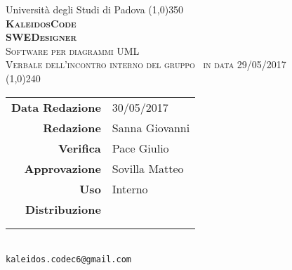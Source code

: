 \documentclass[a4paper,12pt]{article}
\author{KaleidosCode}
\date{29/05/2017}
\begin{document}
	\begin{titlepage}
		\centering Università degli Studi di Padova
		\line(1,0){350}\\
		\vspace{0.4cm}
		{\bfseries\scshape\LARGE KaleidosCode\\}
		\vspace{0.4cm}
		{\bfseries\scshape\LARGE SWEDesigner\\}
		{\scshape\Large Software per diagrammi UML\\}
		\vspace{1cm}
		{\scshape\Large Verbale dell'incontro interno del gruppo \kaleidoscode\ in data 29/05/2017 \\}		%
		\vspace{1.4cm}
		\logo
		\vspace{1.2cm}
		\line(1,0){240}\\
		\begin{tabular}{r|l}
			{\hfill \textbf{Data Redazione}} 	& 30/05/2017\\	%
			{\hfill \textbf{Redazione}} 		& Sanna Giovanni\\
			{\hfill \textbf{Verifica}} 			& Pace Giulio\\
			{\hfill \textbf{Approvazione}} 		& Sovilla Matteo\\
			{\hfill \textbf{Uso}} 				& Interno\\
			{\hfill \textbf{Distribuzione}} 	& \vardanega \\ & \cardin \\ & \kaleidoscode\\
		\end{tabular}\\
		\vspace{2cm}
		\texttt{kaleidos.codec6@gmail.com}
	\end{titlepage}

	\pagestyle{mymain}
	\newpage
		
		
	\label{LastPage}
\end{document}
